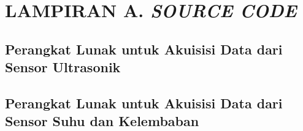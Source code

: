 \chapter{LAMPIRAN A. \textit{SOURCE CODE}}
\section{Perangkat Lunak untuk Akuisisi Data dari Sensor Ultrasonik}
  
\section{Perangkat Lunak untuk Akuisisi Data dari Sensor Suhu dan Kelembaban}
  

